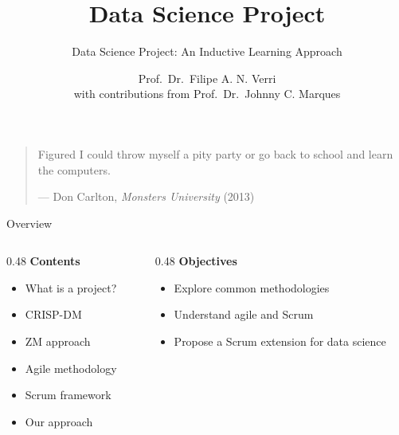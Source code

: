 


\title{Data Science Project}
\subtitle{Data Science Project: An Inductive Learning Approach}
\author{Prof.~Dr.~Filipe A. N. Verri\\{\small with contributions from Prof.~Dr.~Johnny C. Marques}}
\date{}



\maketitle
\bookframe


\begin{frame}{}
  \vfill
  \begin{quote}
    Figured I could throw myself a pity party or go back to school and learn
    the computers.
    \begin{flushright}
      --- Don Carlton, \textit{Monsters University} (2013)
    \end{flushright}
  \end{quote}
  \vfill
\end{frame}


\begin{frame}{Overview}
  \begin{columns}[T]
    \begin{column}{0.48\textwidth}
      \textbf{Contents}
      \begin{itemize}
        \item What is a project?
        \item CRISP-DM
        \item ZM approach
        \item Agile methodology
        \item Scrum framework
        \item Our approach
      \end{itemize}
    \end{column}
    \begin{column}{0.48\textwidth}
      \textbf{Objectives}
      \begin{itemize}
        \item Explore common methodologies
        \item Understand agile and Scrum
        \item Propose a Scrum extension for data science
      \end{itemize}
    \end{column}
  \end{columns}
\end{frame}

